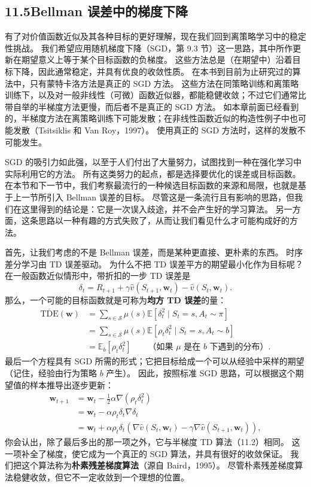 \documentclass[UTF8,12pt,a4paper,fontset=fandol]{ctexart}
\begin{document}
\subsection*{11.5\quad Bellman 误差中的梯度下降}

有了对价值函数近似及其各种目标的更好理解，现在我们回到离策略学习中的稳定性挑战。
我们希望应用随机梯度下降（SGD，第 9.3 节）这一思路，其中所作更新在期望意义上等于某个目标函数的负梯度。
这些方法总是（在期望中）沿着目标下降，因此通常稳定，并具有优良的收敛性质。
在本书到目前为止研究过的算法中，只有蒙特卡洛方法是真正的 SGD 方法。
这些方法在同策略训练和离策略训练下，以及对一般非线性（可微）函数近似器，都能稳健收敛；不过它们通常比带自举的半梯度方法更慢，而后者不是真正的 SGD 方法。
如本章前面已经看到的，半梯度方法在离策略训练下可能发散；在非线性函数近似的构造性例子中也可能发散（Tsitsiklis 和 Van Roy，1997）。
使用真正的 SGD 方法时，这样的发散不可能发生。

SGD 的吸引力如此强，以至于人们付出了大量努力，试图找到一种在强化学习中实际利用它的方法。
所有这类努力的起点，都是选择要优化的误差或目标函数。
在本节和下一节中，我们考察最流行的一种候选目标函数的来源和局限，也就是基于上一节所引入 Bellman 误差的目标。
尽管这是一条流行且有影响的思路，但我们在这里得到的结论是：它是一次误入歧途，并不会产生好的学习算法。
另一方面，这条思路以一种有趣的方式失败了，从而让我们看见什么才可能构成好的方法。

首先，让我们考虑的不是 Bellman 误差，而是某种更直接、更朴素的东西。
时序差分学习由 TD 误差驱动。
为什么不把 TD 误差平方的期望最小化作为目标呢？
在一般函数近似情形中，带折扣的一步 TD 误差是
\[
\delta_t=R_{t+1}+\gamma\hat v(S_{t+1},\mathbf{w}_t)-\hat v(S_t,\mathbf{w}_t).
\]
那么，一个可能的目标函数就是可称为\textbf{均方 TD 误差}的量：
\[
\begin{aligned}
\overline{\mathrm{TDE}}(\mathbf{w})
&=\sum_{s\in\mathcal{S}}\mu(s)\mathbb{E}\left[\delta_t^2\mid S_t=s,A_t\sim\pi\right]\\
&=\sum_{s\in\mathcal{S}}\mu(s)\mathbb{E}\left[\rho_t\delta_t^2\mid S_t=s,A_t\sim b\right]\\
&=\mathbb{E}_b[\rho_t\delta_t^2]\qquad
\text{（如果 $\mu$ 是在 $b$ 下遇到的分布）}.
\end{aligned}
\]
最后一个方程具有 SGD 所需的形式；它把目标给成一个可以从经验中采样的期望（记住，经验由行为策略 $b$ 产生）。
因此，按照标准 SGD 思路，可以根据这个期望值的样本推导出逐步更新：
\begin{equation}
\begin{aligned}
\mathbf{w}_{t+1}
&=\mathbf{w}_t-\frac{1}{2}\alpha\nabla(\rho_t\delta_t^2)\\
&=\mathbf{w}_t-\alpha\rho_t\delta_t\nabla\delta_t\\
&=\mathbf{w}_t+\alpha\rho_t\delta_t\left(\nabla\hat v(S_t,\mathbf{w}_t)-\gamma\nabla\hat v(S_{t+1},\mathbf{w}_t)\right),
\end{aligned}
\tag{11.23}
\end{equation}
你会认出，除了最后多出的那一项之外，它与半梯度 TD 算法（11.2）相同。
这一项补全了梯度，使它成为一个真正的 SGD 算法，并具有很好的收敛保证。
我们把这个算法称为\textbf{朴素残差梯度算法}（源自 Baird，1995）。
尽管朴素残差梯度算法稳健收敛，但它不一定收敛到一个理想的位置。
\end{document}

